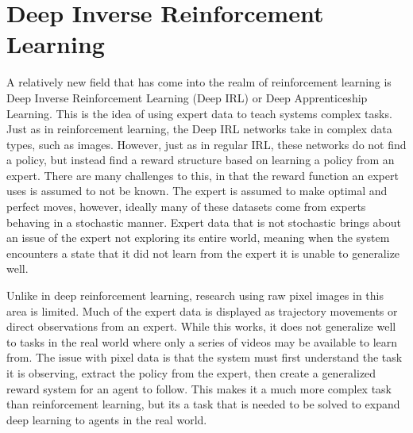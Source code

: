 \documentclass[12pt,american]{report}
\begin{document}
\section{Deep Inverse Reinforcement Learning}
A relatively new field that has come into the realm of reinforcement learning is Deep Inverse Reinforcement Learning (Deep IRL) or Deep Apprenticeship Learning.  This is the idea of using expert data to teach systems complex tasks.  Just as in reinforcement learning, the Deep IRL networks take in complex data types, such as images.  However, just as in regular IRL, these networks do not find a policy, but instead find a reward structure based on learning a policy from an expert.  There are many challenges to this, in that the reward function an expert uses is assumed to not be known.  The expert is assumed to make optimal and perfect moves, however, ideally many of these datasets come from experts behaving in a stochastic manner.  Expert data that is not stochastic brings about an issue of the expert not exploring its entire world, meaning when the system encounters a state that it did not learn from the expert it is unable to generalize well.  

Unlike in deep reinforcement learning, research using raw pixel images in this area is limited.  Much of the expert data is displayed as trajectory movements or direct observations from an expert.  While this works, it does not generalize well to tasks in the real world where only a series of videos may be available to learn from.  The issue with pixel data is that the system must first understand the task it is observing, extract the policy from the expert, then create a generalized reward system for an agent to follow.  This makes it a much more complex task than reinforcement learning, but its a task that is needed to be solved to expand deep learning to agents in the real world.
\end{document}
